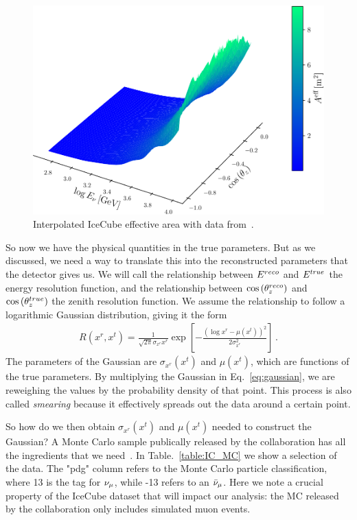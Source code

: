 \begin{figure}[ht]%
    \centering
    \includegraphics[scale=0.6]{figures/aeff.pdf}
    \caption{Interpolated IceCube effective area with data from~\cite{ICaeff}.}
    \label{fig:aeff}
\end{figure}

So now we have the physical quantities in the true parameters. 
But as we discussed, we need a way to translate this into the reconstructed parameters that the detector gives us. We will call the relationship between 
$E^{reco}$ and $E^{true}$ the energy resolution function, and the relationship between $\cos{(\theta_z^{reco})}$ and $\cos{(\theta_z^{true})}$ the zenith resolution function. 
We assume the relationship to follow a logarithmic Gaussian distribution, giving it the form 
\begin{align}\label{eq:gaussian}
    R(x^r, x^t) = \frac{1}{\sqrt{2\pi} \sigma_{x^r}x^r} \exp\left[-\frac{(\log x^r-\mu(x^t))^2}{2\sigma_{x^r}^2}\right]\,.
\end{align}
The parameters of the Gaussian are $\sigma_{x^r}(x^t)$ and $\mu(x^t)$, which are functions of the true parameters. By multiplying the Gaussian in Eq.~\ref{eq:gaussian}, we are reweighing the values by the 
probability density of that point. This process is also called \emph{smearing} because it effectively spreads out the data around a certain point. 

So how do we then obtain $\sigma_{x^r}(x^t)$ and $\mu(x^t)$ needed to construct the Gaussian? A Monte Carlo sample publically released by the 
collaboration has all the ingredients that we need~\cite{IC2016}. In Table.~\ref{table:IC_MC} we show a selection of the data.
The "pdg" column refers to the Monte Carlo particle classification, where 13 is the tag for $\nu_\mu$, while -13 refers
to an $\bar{\nu}_\mu$. Here we note a crucial property of the IceCube dataset that will impact our analysis: the MC released by the collaboration
only includes simulated muon events.

